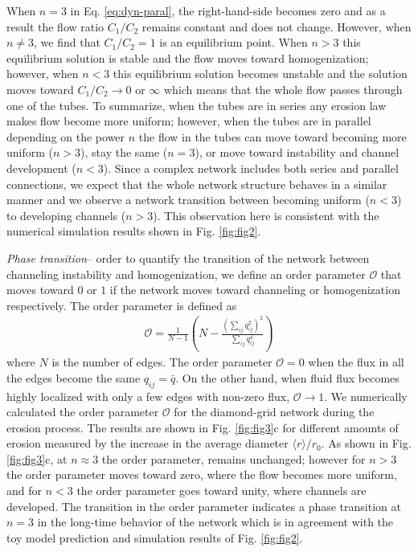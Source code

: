 \documentclass[%
 reprint,
 amsmath,amssymb,
 aps,
]{revtex4-1}
\begin{document}
When $n=3$ in Eq. \eqref{eq:dyn-paral}, the right-hand-side becomes zero and as a result the flow ratio $C_1/C_2$ remains constant and does not change. However, when $n\neq 3$, we find that $C_1/C_2 = 1$ is an equilibrium point. When $n>3$ this equilibrium solution is stable and the flow moves toward homogenization; however, when $n<3$ this equilibrium solution becomes unstable and the solution moves toward $C_1/C_2 \to 0$ or $\infty$ which means that the whole flow passes through one of the tubes. To summarize, when the tubes are in series any erosion law makes flow become more uniform; however, when the tubes are in parallel depending on the power $n$ the flow in the tubes can move toward becoming more uniform ($n>3$), stay the same ($n=3$), or move toward instability and channel development ($n<3$). Since a complex network includes both series and parallel connections, we expect that the whole network structure behaves in a similar manner and we observe a network transition between becoming uniform ($n<3$) to developing channels ($n>3$). This observation here is consistent with the numerical simulation results shown in Fig. \ref{fig:fig2}.  
%

%
%


\textit{Phase transition}--  order to quantify the transition of the network between channeling instability and homogenization, we define an order parameter $\mathcal{O}$ that moves toward $0$ or $1$ if the network moves toward channeling or homogenization respectively. The order parameter is defined as 
%
\begin{align}
    \mathcal{O} = \frac{1}{N-1} \left( N - \frac{\left( \sum_{ij} q^2_{ij}\right)^2}{ \sum_{ij} q^4_{ij}}\right)
\end{align}
%
where $N$ is the number of edges.  The order parameter $\mathcal{O}=0 $ when the flux in all the edges become the same $q_{ij} = \bar{q}$. On the other hand, when fluid flux becomes highly localized with only a few edges with non-zero flux, $\mathcal{O}\to 1$.  We numerically calculated the order parameter $\mathcal{O}$ for the diamond-grid network during the erosion process. The results are shown in Fig. \ref{fig:fig3}c for different amounts of erosion measured by the increase in the average diameter $\langle r\rangle /r_0$. As shown in 
 Fig. \ref{fig:fig3}c, at $n\approx 3$ the order parameter, remains unchanged; however for $n>3$ the order parameter moves toward zero, where the flow becomes more uniform, and for $n<3$ the order parameter goes toward unity, where channels are developed. The transition in the order parameter indicates a phase transition at $n=3$ in the long-time behavior of the network which is in agreement with the toy model prediction and simulation results of Fig. \ref{fig:fig2}. 
%
\end{document}
